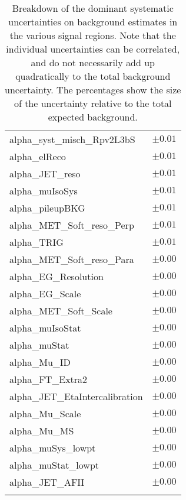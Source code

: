 \begin{table}
\begin{center}
\begin{tabular*}{\textwidth}{@{\extracolsep{\fill}}lc}
alpha\_syst\_misch\_Rpv2L3bS         & $\pm 0.01$       \\
alpha\_elReco         & $\pm 0.01$       \\
alpha\_JET\_reso         & $\pm 0.01$       \\
alpha\_muIsoSys         & $\pm 0.01$       \\
alpha\_pileupBKG         & $\pm 0.01$       \\
alpha\_MET\_Soft\_reso\_Perp         & $\pm 0.01$       \\
alpha\_TRIG         & $\pm 0.01$       \\
alpha\_MET\_Soft\_reso\_Para         & $\pm 0.00$       \\
alpha\_EG\_Resolution         & $\pm 0.00$       \\
alpha\_EG\_Scale         & $\pm 0.00$       \\
alpha\_MET\_Soft\_Scale         & $\pm 0.00$       \\
alpha\_muIsoStat         & $\pm 0.00$       \\
alpha\_muStat         & $\pm 0.00$       \\
alpha\_Mu\_ID         & $\pm 0.00$       \\
alpha\_FT\_Extra2         & $\pm 0.00$       \\
alpha\_JET\_EtaIntercalibration         & $\pm 0.00$       \\
alpha\_Mu\_Scale         & $\pm 0.00$       \\
alpha\_Mu\_MS         & $\pm 0.00$       \\
alpha\_muSys\_lowpt         & $\pm 0.00$       \\
alpha\_muStat\_lowpt         & $\pm 0.00$       \\
alpha\_JET\_AFII         & $\pm 0.00$       \\
\noalign{\smallskip}\hline\noalign{\smallskip}
\end{tabular*}
\end{center}
\caption[Breakdown of uncertainty on background estimates]{
Breakdown of the dominant systematic uncertainties on background estimates in the various signal regions.
Note that the individual uncertainties can be correlated, and do not necessarily add up quadratically to 
the total background uncertainty. The percentages show the size of the uncertainty relative to the total expected background.
\label{table.results.bkgestimate.uncertainties.Rpv2L3bS}}
\end{table}
\clearpage
%